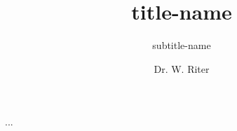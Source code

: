 \begin{ExampleBlock}{}
\title{title-name}
\subtitle{subtitle-name}    %
\author{Dr. W. Riter}       %


\maketitle
...


\end{ExampleBlock}
